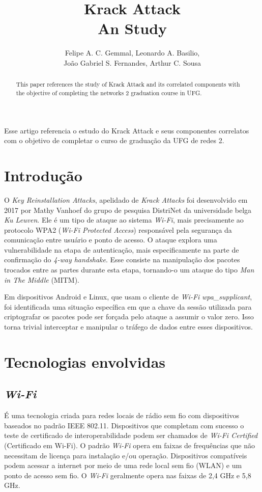 \documentclass[12pt]{article}
\title{Krack Attack \\ An Study}
\author{Felipe A. C. Gemmal\inst{1}, Leonardo A. Basilio\inst{1},\\ João Gabriel S. Fernandes\inst{1}, Arthur C. Sousa\inst{1} }
\begin{document}
 

\maketitle

\begin{abstract}
	This paper references the study of Krack Attack and its correlated components with the objective of completing the networks 2 graduation course in UFG.
\end{abstract}

\begin{resumo} 
	Esse artigo referencia o estudo do Krack Attack e seus componentes correlatos com o objetivo de completar o curso de graduação da UFG de redes 2.
\end{resumo}


\section{Introdução}
O \textit{Key Reinstallation Attacks}, apelidado de \textit{Krack Attacks} \cite{vanhoef:2017} foi desenvolvido em 2017 por Mathy Vanhoef do grupo de pesquisa DistriNet da universidade belga \textit{Ku Leuven}. Ele é um tipo de ataque ao sistema \textit{Wi-Fi}, mais precisamente ao protocolo WPA2 (\textit{Wi-Fi Protected Access}) responsável pela segurança da comunicação entre usuário e ponto de acesso. O ataque explora uma vulnerabilidade na etapa de autenticação, mais especificamente na parte de confirmação do \textit{4-way handshake}. Esse consiste na manipulação dos pacotes trocados entre as partes durante esta etapa, tornando-o um ataque do tipo \textit{Man in The Middle} (MITM).

Em dispositivos Android e Linux, que usam o cliente de \textit{Wi-Fi} \textit{wpa\_supplicant}, foi identificada uma situação específica em que a chave da sessão utilizada para criptografar os pacotes pode ser forçada pelo ataque a assumir o valor zero. Isso torna trivial interceptar e manipular o tráfego de dados entre esses dispositivos.

\section{Tecnologias envolvidas}
\subsection{\textit{Wi-Fi}}
É uma tecnologia criada para redes locais de rádio sem fio com dispositivos baseados no padrão IEEE 802.11. Dispositivos que completam com sucesso o teste de certificado de interoperabilidade podem ser chamados de \textit{Wi-Fi Certified} (Certificado em Wi-Fi). O padrão \textit{Wi-Fi} opera em faixas de frequências que não necessitam de licença para instalação e/ou operação. Dispositivos compatíveis podem acessar a internet por meio de uma rede local sem fio (WLAN) e um ponto de acesso sem fio. O \textit{Wi-Fi} geralmente opera nas faixas de 2,4 GHz e 5,8 GHz.
\end{document}
